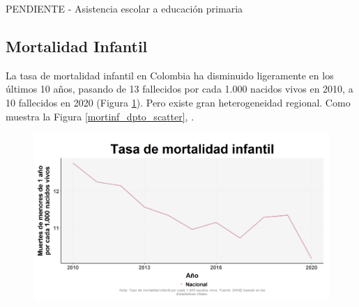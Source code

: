         PENDIENTE - Asistencia escolar a educación primaria

    \subsection{Mortalidad Infantil}

        La tasa de mortalidad infantil en Colombia ha disminuido ligeramente en los últimos 10 años, pasando de 13 fallecidos por cada 1.000 nacidos vivos en 2010, a 10 fallecidos en 2020 (Figura \ref{mortinf_nal_trend}). Pero existe gran heterogeneidad regional. Como muestra la Figura \ref{mortinf_dpto_scatter}, .   

    \begin{figure}[H]
        \caption[Tasa de mortalidad infantil a nivel nacional ]{\label{mortinf_nal_trend} }
        \begin{center}
        \includegraphics[width=\textwidth,keepaspectratio]{img/var_291_trend.png}
        \end{center}
    \end{figure}


